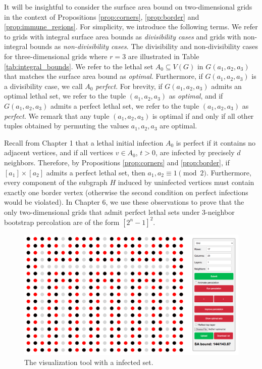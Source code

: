 It will be insightful to consider the surface area bound on two-dimensional grids in the context of Propositions \ref{prop:corners}, \ref{prop:border} and \ref{prop:immune_regions}. For simplicity, we introduce the following terms. We refer to grids with integral surface area bounds as \emph{divisibility cases} and grids with non-integral bounds as \emph{non-divisibility cases}. The divisibility and non-divisibility cases for three-dimensional grids where $r=3$ are illustrated in Table \ref{tab:integral_bounds}. We refer to the lethal set $A_0 \subseteq V(G)$ in $G(a_1,a_2,a_3)$ that matches the surface area bound as \emph{optimal}. Furthermore, if $G(a_1,a_2,a_3)$ is a divisibility case, we call $A_0$ \emph{perfect}. For brevity, if $G(a_1,a_2,a_3)$ admits an optimal lethal set, we refer to the tuple $(a_1,a_2,a_3)$ as \emph{optimal}, and if $G(a_1,a_2,a_3)$ admits a perfect lethal set, we refer to the tuple $(a_1,a_2,a_3)$ as \emph{perfect}. We remark that any tuple $(a_1, a_2, a_3)$ is optimal if and only if all other tuples obtained by permuting the values $a_1, a_2, a_3$ are optimal.

Recall from Chapter 1 that a lethal initial infection $A_0$ is perfect if it contains no adjacent vertices, and if all vertices $v \in A_{0}$, $t > 0$, are infected by precisely $d$ neighbors. Therefore, by Propositions \ref{prop:corners} and \ref{prop:border}, if  $[a_1] \times [a_2]$ admits a perfect lethal set, then $a_1, a_2 \equiv 1 \pmod 2$. Furthermore, every component of the subgraph $H$ induced by uninfected vertices must contain exactly one border vertex (otherwise the second condition on perfect infections would be violated). In Chapter 6, we use these observations to prove that the only two-dimensional grids that admit perfect lethal sets under 3-neighbor bootstrap percolation are of the form $[2^n-1]^2$.

\begin{figure}[]
\centering
\includegraphics[width=\textwidth]{figures/2/visualizer}
\caption{The visualization tool with a infected set.}
\label{fig:visualizer}
\end{figure} 


